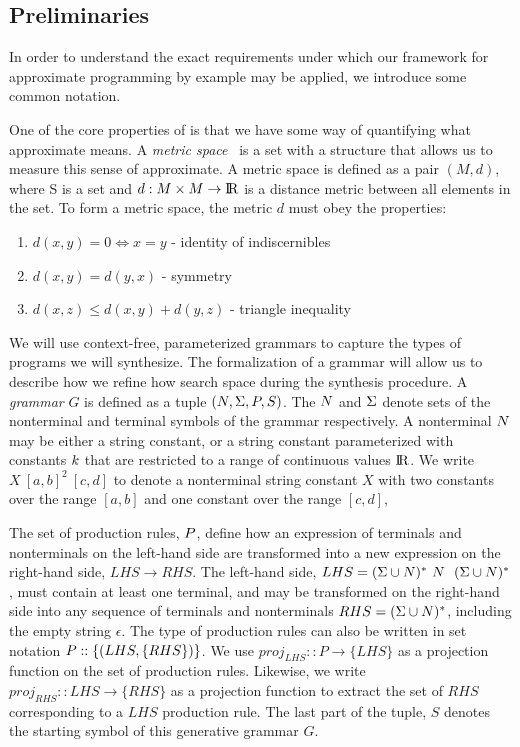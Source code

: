 \subsection{Preliminaries}

In order to understand the exact requirements under which our framework for approximate programming by example may be applied, we introduce some common notation.

One of the core properties of \approximatePBE is that we have some way of quantifying what approximate means.
A \textit{metric space}~\cite{textbook} is a set with a structure that allows us to measure this sense of approximate.
A metric space is defined as a pair $(M,d)$, where S is a set and $d:M \times M \to {\rm I\!R}$ is a distance metric between all elements in the set. 
To form a metric space, the metric $d$ must obey the properties:

\begin{enumerate}
  \item $d(x,y) = 0 \Leftrightarrow x = y$ - identity of indiscernibles
  \item $d(x,y)  = d(y,x)$ - symmetry
  \item $d(x,z) \le d(x,y) + d(y, z)$ - triangle inequality
\end{enumerate}

We will use context-free, parameterized grammars to capture the types of programs we will synthesize.
The formalization of a grammar will allow us to describe how we refine how search space during the synthesis procedure.
A \textit{grammar} $G$ is defined as a tuple $(N,\Sigma,P,S)$.
The $N$ and $\Sigma$ denote sets of the nonterminal and terminal symbols of the grammar respectively.
A nonterminal $N$ may be either a string constant, or a string constant parameterized with constants ${k}$ that are restricted to a range of continuous values ${\rm I\!R}$.
We write $X\ [a,b]^2 \ [c,d]$ to denote a nonterminal string constant $X$ with two constants over the range $[a,b]$ and one constant over the range $[c,d]$,

The set of production rules, $P$, define how an expression of terminals and nonterminals on the left-hand side are transformed into a new expression on the right-hand side, $LHS \to RHS$.
The left-hand side, $LHS = (\Sigma \cup N)^{*} \ N \ \ (\Sigma \cup N)^{*}$, must contain at least one terminal, 
  and may be transformed on the right-hand side into any sequence of terminals and nonterminals $RHS = (\Sigma \cup N)^{*}$, including the empty string $\epsilon$.
The type of production rules can also be written in set notation $P :: \{(LHS,\{RHS\})\}$.
We use $proj_{LHS} :: P \to \{LHS\}$ as a projection function on the set of production rules.
Likewise, we write $proj_{RHS} :: LHS \to \{RHS\}$ as a projection function to extract the set of $RHS$ corresponding to a $LHS$ production rule.
The last part of the tuple, $S$ denotes the starting symbol of this generative grammar $G$.

